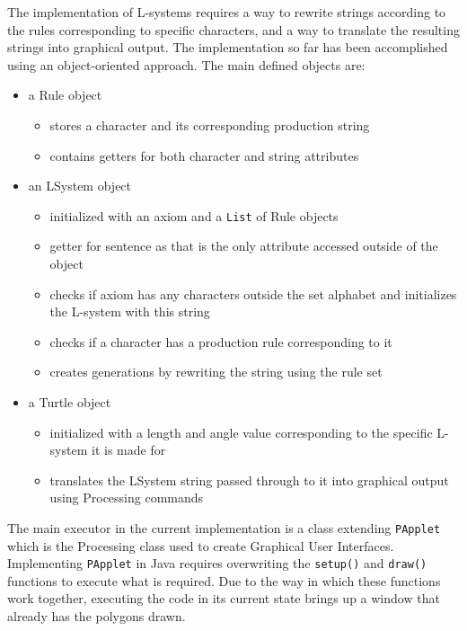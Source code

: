 \documentclass[]{interim_report}
\begin{document}
The implementation of L-systems requires a way to rewrite strings according to the rules corresponding to specific characters, and a way to translate the resulting strings into graphical output. The implementation so far has been accomplished using an object-oriented approach. The main defined objects are:
\begin{itemize}
    \item a Rule object
    \begin{itemize}
        \item stores a character and its corresponding production string
        \item contains getters for both character and string attributes
    \end{itemize}
    \item an LSystem object
    \begin{itemize}
        \item initialized with an axiom and a \verb|List| of Rule objects
        \item getter for sentence as that is the only attribute accessed outside of the object
        \item checks if axiom has any characters outside the set alphabet and initializes the L-system with this string
        \item checks if a character has a production rule corresponding to it
        \item creates generations by rewriting the string using the rule set
    \end{itemize}
    \item a Turtle object
    \begin{itemize}
        \item initialized with a length and angle value corresponding to the specific L-system it is made for
        \item translates the LSystem string passed through to it into graphical output using Processing commands
    \end{itemize}
\end{itemize}

The main executor in the current implementation is a class extending \verb|PApplet| which is the Processing class used to create Graphical User Interfaces. Implementing \verb|PApplet| in Java requires overwriting the \verb|setup()| and \verb|draw()| functions to execute what is required. Due to the way in which these functions work together, executing the code in its current state brings up a window that already has the polygons drawn. 
\end{document}
